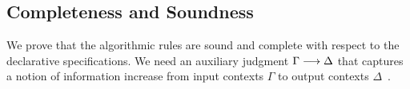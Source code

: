






\subsection{Completeness and Soundness}

We prove that the algorithmic rules are sound and complete with
respect to the declarative specifications. We need an auxiliary judgment
$\Gamma \longrightarrow \Delta$ that captures a notion of information increase from input
contexts $\Gamma$ to output contexts $\Delta$~\citep{dunfield2013complete}.

